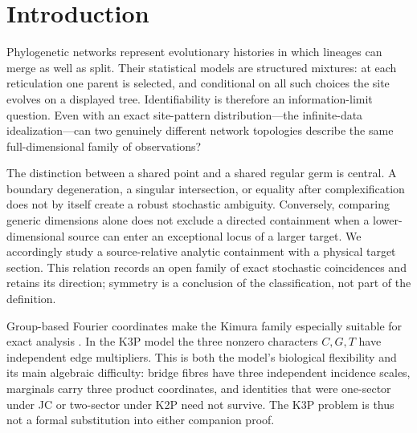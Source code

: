 \section{Introduction}\label{sec:introduction}

Phylogenetic networks represent evolutionary histories in which lineages can
merge as well as split.  Their statistical models are structured mixtures:
at each reticulation one parent is selected, and conditional on all such
choices the site evolves on a displayed tree.  Identifiability is therefore
an information-limit question.  Even with an exact site-pattern
distribution---the infinite-data idealization---can two genuinely different
network topologies describe the same full-dimensional family of
observations?

The distinction between a shared point and a shared regular germ is central.
A boundary degeneration, a singular intersection, or equality after
complexification does not by itself create a robust stochastic ambiguity.
Conversely, comparing generic dimensions alone does not exclude a directed
containment when a lower-dimensional source can enter an exceptional locus
of a larger target.  We accordingly study a source-relative analytic
containment with a physical target section.  This relation records an open
family of exact stochastic coincidences and retains its direction; symmetry
is a conclusion of the classification, not part of the definition.

Group-based Fourier coordinates make the Kimura family especially suitable
for exact analysis \cite{EvansSpeed1993,SturmfelsSullivant2005}.  In the
K3P model the three nonzero characters \(C,G,T\) have independent edge
multipliers.  This is both the model's biological flexibility and its main
algebraic difficulty: bridge fibres have three independent incidence scales,
marginals carry three product coordinates, and identities that were
one-sector under JC or two-sector under K2P need not survive.  The K3P
problem is thus not a formal substitution into either companion proof.

